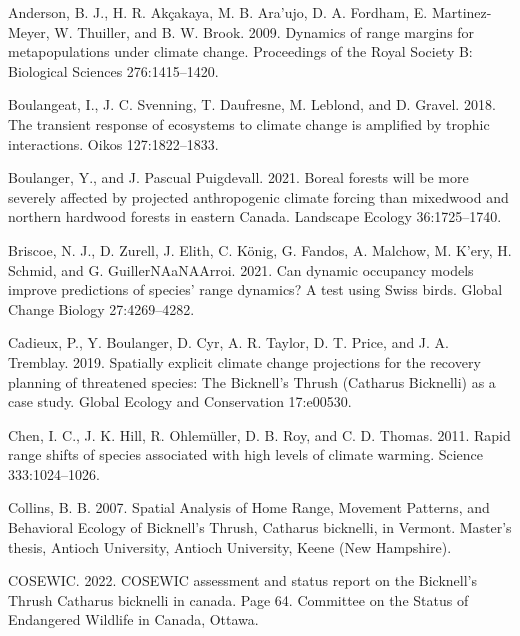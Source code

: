 \documentclass[12pt]{article}
\newlength{\cslhangindent}
\newenvironment{cslreferences}%
  {\setlength{\parindent}{0pt}%
  \everypar{\setlength{\hangindent}{\cslhangindent}}\ignorespaces}%
  {\par}
\begin{document}
\hypertarget{refs}{}
\begin{cslreferences}
\leavevmode\hypertarget{ref-anderson_dynamics_2009}{}%
Anderson, B. J., H. R. Akçakaya, M. B. Ara\a'ujo, D. A. Fordham, E.
Martinez-Meyer, W. Thuiller, and B. W. Brook. 2009. Dynamics of range
margins for metapopulations under climate change. Proceedings of the
Royal Society B: Biological Sciences 276:1415--1420.

\leavevmode\hypertarget{ref-boulangeat_transient_2018}{}%
Boulangeat, I., J. C. Svenning, T. Daufresne, M. Leblond, and D. Gravel.
2018. The transient response of ecosystems to climate change is
amplified by trophic interactions. Oikos 127:1822--1833.

\leavevmode\hypertarget{ref-boulanger_boreal_2021}{}%
Boulanger, Y., and J. Pascual Puigdevall. 2021. Boreal forests will be
more severely affected by projected anthropogenic climate forcing than
mixedwood and northern hardwood forests in eastern Canada. Landscape
Ecology 36:1725--1740.

\leavevmode\hypertarget{ref-briscoe_can_2021}{}%
Briscoe, N. J., D. Zurell, J. Elith, C. König, G. Fandos, A. Malchow, M.
K\a'ery, H. Schmid, and G. GuillerNAaNAArroi. 2021. Can dynamic
occupancy models improve predictions of species' range dynamics? A test
using Swiss birds. Global Change Biology 27:4269--4282.

\leavevmode\hypertarget{ref-cadieux_spatially_2019}{}%
Cadieux, P., Y. Boulanger, D. Cyr, A. R. Taylor, D. T. Price, and J. A.
Tremblay. 2019. Spatially explicit climate change projections for the
recovery planning of threatened species: The Bicknell's Thrush (Catharus
Bicknelli) as a case study. Global Ecology and Conservation 17:e00530.

\leavevmode\hypertarget{ref-chen_rapid_2011}{}%
Chen, I. C., J. K. Hill, R. Ohlemüller, D. B. Roy, and C. D. Thomas.
2011. Rapid range shifts of species associated with high levels of
climate warming. Science 333:1024--1026.

\leavevmode\hypertarget{ref-collins_spatial_2007}{}%
Collins, B. B. 2007. Spatial Analysis of Home Range, Movement Patterns,
and Behavioral Ecology of Bicknell's Thrush, Catharus bicknelli, in
Vermont. Master's thesis, Antioch University, Antioch University, Keene
(New Hampshire).

\leavevmode\hypertarget{ref-cosewic_cosewic_2022}{}%
COSEWIC. 2022. COSEWIC assessment and status report on the Bicknell's
Thrush Catharus bicknelli in canada. Page 64. Committee on the Status of
Endangered Wildlife in Canada, Ottawa.


\end{cslreferences}
\end{document}
